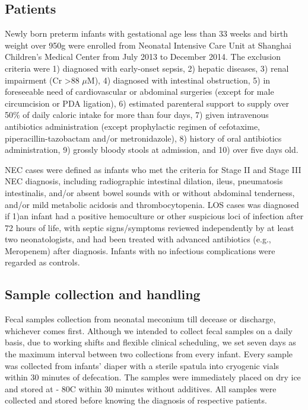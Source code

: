 \documentclass[fleqn,10pt]{wlpeerj} %
\begin{document}
  \subsection*{Patients}
  Newly born preterm infants with gestational age less than 33 weeks and birth weight over 950g were enrolled from Neonatal Intensive Care Unit at Shanghai Children’s Medical Center from July 2013 to December 2014. The exclusion criteria were 1) diagnosed with early-onset sepsis, 2) hepatic diseases, 3) renal impairment (Cr \textgreater 88 $\mu$M), 4) diagnosed with intestinal obstruction, 5) in foreseeable need of cardiovascular or abdominal surgeries (except for male circumcision or PDA ligation), 6) estimated parenteral support to supply over 50\% of daily caloric intake for more than four days, 7) given intravenous antibiotics administration (except prophylactic regimen of cefotaxime, piperacillin-tazobactam and/or metronidazole), 8) history of oral antibiotics administration, 9) grossly bloody stools at admission, and 10) over five days old.

  NEC cases were defined as infants who met the criteria for Stage II and Stage III NEC diagnosis\citep{bell1978neonatal}, including radiographic intestinal dilation, ileus, pneumatosis intestinalis, and/or absent bowel sounds with or without abdominal tenderness, and/or mild metabolic acidosis and thrombocytopenia. LOS cases was diagnosed if 1)an infant had a positive hemoculture or other suspicious loci of infection after 72 hours of life, with septic signs/symptoms reviewed independently by at least two neonatologists, and had been treated with advanced antibiotics (e.g., Meropenem) after diagnosis. Infants with no infectious complications were regarded as controls.

  \subsection*{Sample collection and handling}
  Fecal samples collection from neonatal meconium till decease or discharge, whichever comes first. Although we intended to collect fecal samples on a daily basis, due to working shifts and flexible clinical scheduling, we set seven days as the maximum interval between two collections from every infant. Every sample was collected from infants’ diaper with a sterile spatula into cryogenic vials within 30 minutes of defecation. The samples were immediately placed on dry ice and stored at - 80\textdegree{}C within 30 minutes without additives. All samples were collected and stored before knowing the diagnosis of respective patients.
\end{document}
